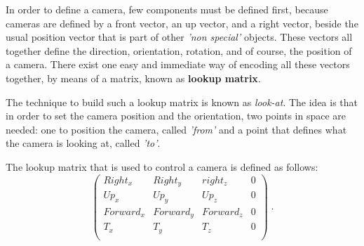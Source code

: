 \documentclass[12pt,a4paper]{extarticle}
\newcommand{\linespace}{\vspace{0pt}}
\begin{document}
In order to define a camera, few components must be defined first, because cameras are defined by a front vector, an up vector, and a right vector, beside the usual position vector that is part of other \textit{'non special'} objects. These vectors all together define the direction, orientation, rotation, and of course, the position of a camera.
There exist one easy and immediate way of encoding all these vectors together, by means of a matrix, known as \textbf{lookup matrix}.
\linespace

The technique to build such a lookup matrix is known as \textit{look-at}. The idea is that in order to set the camera position and the orientation, two points in space are needed: one to position the camera, called \textit{'from'} and a point that defines what the camera is looking at, called \textit{'to'}.

The lookup matrix that is used to control a camera is defined as follows:
\[
\begin{pmatrix}
Right_{x} & Right_{y} & right_{z} & 0\\
Up_{x} & Up_{y} & Up_{z} & 0\\
Forward_{x} & Forward_{y} & Forward_{z} & 0\\
T_{x}& T_{y} & T_{z} & 0\\
\end{pmatrix}
\;.
\]
\end{document}
